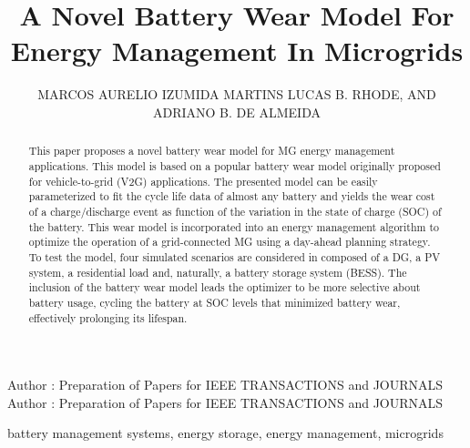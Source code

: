 \documentclass{ieeeaccess}
\begin{document}
    


    \title{A Novel Battery Wear Model For Energy Management In Microgrids}

    \author{
    	\uppercase{Marcos Aurelio Izumida Martins}
    	\uppercase{Lucas B. Rhode},
    	\uppercase{and Adriano B. de Almeida}
    }

    \address[1]{Sustainable Energies Center, CERTI Foundation, Brazil (e-mail: mlz@certi.org.br)}
    \address[2]{Underwriters Laboratories, Brazil (e-mail: lucas.rhode@ul.com)}
    \address[3]{Western Parana State University, Brazil (e-mail: adriano.almeida@unioeste.br)}

    \markboth
    {Author \headeretal: Preparation of Papers for IEEE TRANSACTIONS and JOURNALS}
    {Author \headeretal: Preparation of Papers for IEEE TRANSACTIONS and JOURNALS}


    \begin{abstract}
        This paper proposes a novel battery wear model for \ac{MG} energy management applications. This model is based on a popular battery wear model originally proposed for vehicle-to-grid (V2G) applications. The presented model can be easily parameterized to fit the cycle life data of almost any battery and yields the wear cost of a charge/discharge event as function of the variation in the state of charge (SOC) of the battery. This wear model is incorporated into an energy management algorithm to optimize the operation of a grid-connected \ac{MG} using a day-ahead planning strategy. To test the model, four simulated scenarios are considered in  composed of a \ac{DG}, a \ac{PV} system, a residential load and, naturally, a battery storage system (\ac{BESS}). The inclusion of the battery wear model leads the optimizer to be more selective about battery usage, cycling the battery at \ac{SOC} levels that minimized battery wear, effectively prolonging its lifespan.
    \end{abstract}

    \begin{keywords}
        battery management systems, energy storage, energy management, microgrids
    \end{keywords}
\end{document}
